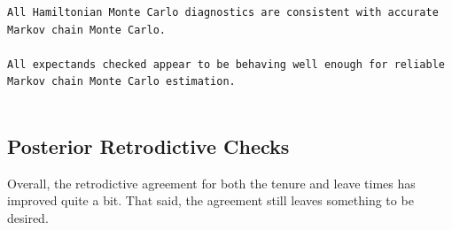 \documentclass[
  letterpaper,
  DIV=11,
  numbers=noendperiod]{scrartcl}
\begin{document}
\begin{verbatim}
All Hamiltonian Monte Carlo diagnostics are consistent with accurate
Markov chain Monte Carlo.
 
All expectands checked appear to be behaving well enough for reliable
Markov chain Monte Carlo estimation.
 
\end{verbatim}

\subsection{Posterior Retrodictive
Checks}\label{posterior-retrodictive-checks-2}

Overall, the retrodictive agreement for both the tenure and leave times
has improved quite a bit. That said, the agreement still leaves
something to be desired.
\end{document}
